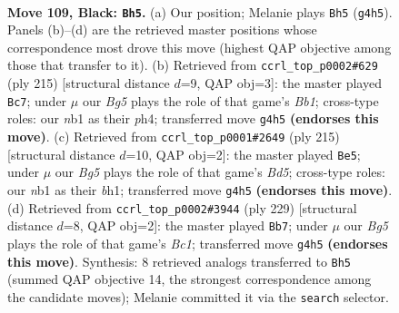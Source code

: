 \documentclass[11pt]{article}
\begin{document}
\clearpage

\begin{figure}[p]\centering
\begin{subfigure}{0.46\textwidth}\centering
\resizebox{\linewidth}{!}{%
\newchessgame
\chessboard[
  setfen={8/6B1/4k3/8/p1p3b1/8/5K2/1N6 b - - 73 109},
  showmover=false,
  pgfstyle=straightmove, color=movearrow, markmove={g4-h5}
]}
\caption{}
\end{subfigure}\hfill
\begin{subfigure}{0.46\textwidth}\centering
\resizebox{\linewidth}{!}{%
\newchessgame
\chessboard[
  setfen={1b6/1P1B4/8/4k2p/7P/5K2/8/8 b - - 4 108},
  showmover=false,
  pgfstyle=straightmove, color=movearrow, markmove={b8-c7}
]}
\caption{}
\end{subfigure}
\\[4pt]
\begin{subfigure}{0.46\textwidth}\centering
\resizebox{\linewidth}{!}{%
\newchessgame
\chessboard[
  setfen={8/8/8/2k5/3b4/6pp/8/5K1B b - - 57 108},
  showmover=false,
  pgfstyle=straightmove, color=movearrow, markmove={d4-e5}
]}
\caption{}
\end{subfigure}\hfill
\begin{subfigure}{0.46\textwidth}\centering
\resizebox{\linewidth}{!}{%
\newchessgame
\chessboard[
  setfen={2bB4/8/8/5k1p/5p2/8/5K2/8 b - - 77 115},
  showmover=false,
  pgfstyle=straightmove, color=movearrow, markmove={c8-b7}
]}
\caption{}
\end{subfigure}
\caption{\textbf{Move 109, Black: \texttt{Bh5}.} (a) Our position; Melanie plays \texttt{Bh5} (\texttt{g4h5}). Panels (b)--(d) are the retrieved master positions whose correspondence most drove this move (highest QAP objective among those that transfer to it). (b) Retrieved from \texttt{ccrl\_top\_p0002\#629} (ply 215) [structural distance $d$=9, QAP obj=3]: the master played \texttt{Bc7}; under $\mu$ our \emph{Bg5} plays the role of that game's \emph{Bb1}; cross-type roles: our \emph{n}b1 as their \emph{p}h4; transferred move \texttt{g4h5} \textbf{(endorses this move)}. (c) Retrieved from \texttt{ccrl\_top\_p0001\#2649} (ply 215) [structural distance $d$=10, QAP obj=2]: the master played \texttt{Be5}; under $\mu$ our \emph{Bg5} plays the role of that game's \emph{Bd5}; cross-type roles: our \emph{n}b1 as their \emph{b}h1; transferred move \texttt{g4h5} \textbf{(endorses this move)}. (d) Retrieved from \texttt{ccrl\_top\_p0002\#3944} (ply 229) [structural distance $d$=8, QAP obj=2]: the master played \texttt{Bb7}; under $\mu$ our \emph{Bg5} plays the role of that game's \emph{Bc1}; transferred move \texttt{g4h5} \textbf{(endorses this move)}. Synthesis: 8 retrieved analogs transferred to \texttt{Bh5} (summed QAP objective 14, the strongest correspondence among the candidate moves); Melanie committed it via the \texttt{search} selector.}
\label{fig:thought-m217}
\end{figure}
\end{document}
